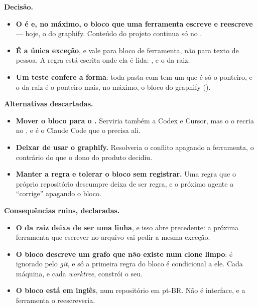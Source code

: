 \textbf{Decisão.}

\begin{itemize}
  \item \textbf{O  é  e, no máximo, o bloco que uma
    ferramenta escreve e reescreve} --- hoje, o do graphify. Conteúdo do projeto
    continua só no .
  \item \textbf{É a única exceção}, e vale para bloco de ferramenta, não para texto
    de pessoa. A regra está escrita onde ela é lida: ,
     e o  da raiz.
  \item \textbf{Um teste confere a forma}: toda pasta com  tem um
     que é só o ponteiro, e o da raiz é o ponteiro mais, no máximo, o
    bloco do graphify ().
\end{itemize}

\textbf{Alternativas descartadas.}

\begin{itemize}
  \item \textbf{Mover o bloco para o .} Serviria também a Codex e Cursor,
    mas o  o recria no , e é o Claude Code que o
    precisa ali.
  \item \textbf{Deixar de usar o graphify.} Resolveria o conflito apagando a ferramenta, o
    contrário do que o dono do produto decidiu.
  \item \textbf{Manter a regra e tolerar o bloco sem registrar.} Uma regra que o próprio
    repositório descumpre deixa de ser regra, e o próximo agente a \enquote{corrige}
    apagando o bloco.
\end{itemize}

\textbf{Consequências ruins, declaradas.}

\begin{itemize}
  \item \textbf{O  da raiz deixa de ser uma linha}, e isso abre
    precedente: a próxima ferramenta que escrever no arquivo vai pedir a mesma exceção.
  \item \textbf{O bloco descreve um grafo que não existe num clone limpo}:
     é ignorado pelo \emph{git}, e só a primeira regra do bloco é
    condicional a ele. Cada máquina, e cada \emph{worktree}, constrói o seu.
  \item \textbf{O bloco está em inglês}, num repositório em pt-BR. Não é interface, e a
    ferramenta o reescreveria.
\end{itemize}

